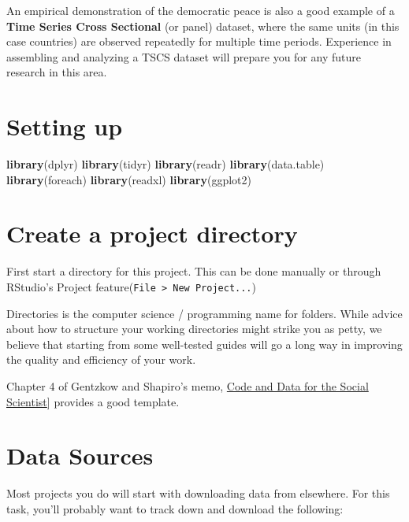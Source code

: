 \documentclass[]{book}
\newenvironment{Shaded}{\begin{snugshade}}{\end{snugshade}}
\newcommand{\KeywordTok}[1]{\textcolor[rgb]{0.13,0.29,0.53}{\textbf{#1}}}
\newcommand{\NormalTok}[1]{#1}
\theoremstyle{definition}
\theoremstyle{definition}
\theoremstyle{definition}
\theoremstyle{remark}
\begin{document}
An empirical demonstration of the democratic peace is also a good example of a \textbf{Time Series Cross Sectional} (or panel) dataset, where the same units (in this case countries) are observed repeatedly for multiple time periods. Experience in assembling and analyzing a TSCS dataset will prepare you for any future research in this area.

\hypertarget{setting-up}{%
\section{Setting up}\label{setting-up}}

\begin{Shaded}
\begin{Highlighting}[]
\KeywordTok{library}\NormalTok{(dplyr)}
\KeywordTok{library}\NormalTok{(tidyr)}
\KeywordTok{library}\NormalTok{(readr)}
\KeywordTok{library}\NormalTok{(data.table)}
\KeywordTok{library}\NormalTok{(foreach)}
\KeywordTok{library}\NormalTok{(readxl)}
\KeywordTok{library}\NormalTok{(ggplot2)}
\end{Highlighting}
\end{Shaded}

\hypertarget{create-a-project-directory}{%
\section{Create a project directory}\label{create-a-project-directory}}

First start a directory for this project. This can be done manually or through RStudio's Project feature(\texttt{File\ \textgreater{}\ New\ Project...})

Directories is the computer science / programming name for folders. While advice about how to structure your working directories might strike you as petty, we believe that starting from some well-tested guides will go a long way in improving the quality and efficiency of your work.

Chapter 4 of Gentzkow and Shapiro's memo, \href{https://web.stanford.edu/~gentzkow/research/CodeAndData.pdf}{Code and Data for the Social Scientist}{]} provides a good template.

\hypertarget{data-sources}{%
\section{Data Sources}\label{data-sources}}

Most projects you do will start with downloading data from elsewhere. For this task, you'll probably want to track down and download the following:
\end{document}
